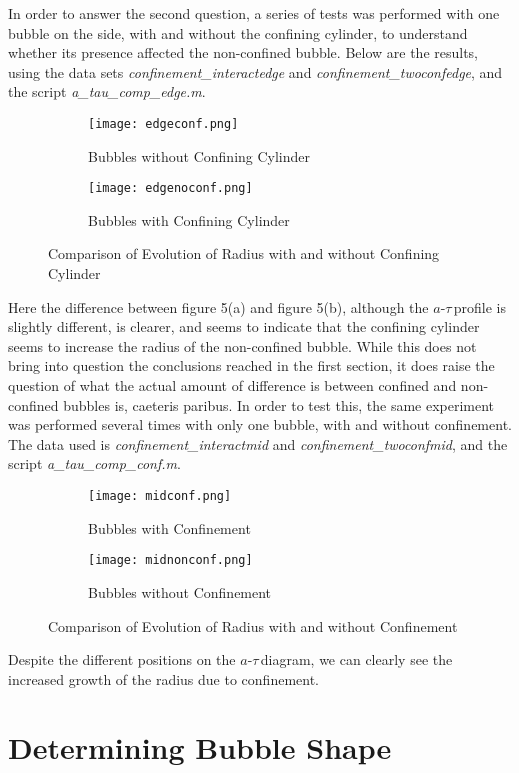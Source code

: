 \documentclass{article}
\newcommand{\at}{$a$-$\tau$\,}
\begin{document}
In order to answer the second question, a series of tests was performed with one bubble on the side, with and without the confining cylinder, to understand whether its presence affected the non-confined bubble. Below are the results, using the data sets \emph{confinement\_interactedge} and \emph{confinement\_twoconfedge}, and the script \emph{a\_tau\_comp\_edge.m}.
\begin{figure}[H]
  \centering
  \begin{subfigure}[b]{0.49\linewidth}
    \texttt{[image: edgeconf.png]}
    \caption{Bubbles without Confining Cylinder}
  \end{subfigure}
  \begin{subfigure}[b]{0.49\linewidth}
    \texttt{[image: edgenoconf.png]}
    \caption{Bubbles with Confining Cylinder}
  \end{subfigure}
  \caption{Comparison of Evolution of Radius with and without Confining Cylinder}
\end{figure}
Here the difference between figure 5(a) and figure 5(b), although the \at profile is slightly different, is clearer, and seems to indicate that the confining cylinder seems to increase the radius of the non-confined bubble. While this does not bring into question the conclusions reached in the first section, it does raise the question of what the actual amount of difference is between confined and non-confined bubbles is, caeteris paribus. In order to test this, the same experiment was performed several times with only one bubble, with and without confinement. The data used is \emph{confinement\_interactmid} and \emph{confinement\_twoconfmid}, and the script \emph{a\_tau\_comp\_conf.m}.
\begin{figure}[H]
  \centering
  \begin{subfigure}[b]{0.49\linewidth}
    \texttt{[image: midconf.png]}
    \caption{Bubbles with Confinement}
  \end{subfigure}
  \begin{subfigure}[b]{0.49\linewidth}
    \texttt{[image: midnonconf.png]}
    \caption{Bubbles without Confinement}
  \end{subfigure}
  \caption{Comparison of Evolution of Radius with and without Confinement}
\end{figure}
Despite the different positions on the \at diagram, we can clearly see the increased growth of the radius due to confinement.

\section{Determining Bubble Shape}
\end{document}
